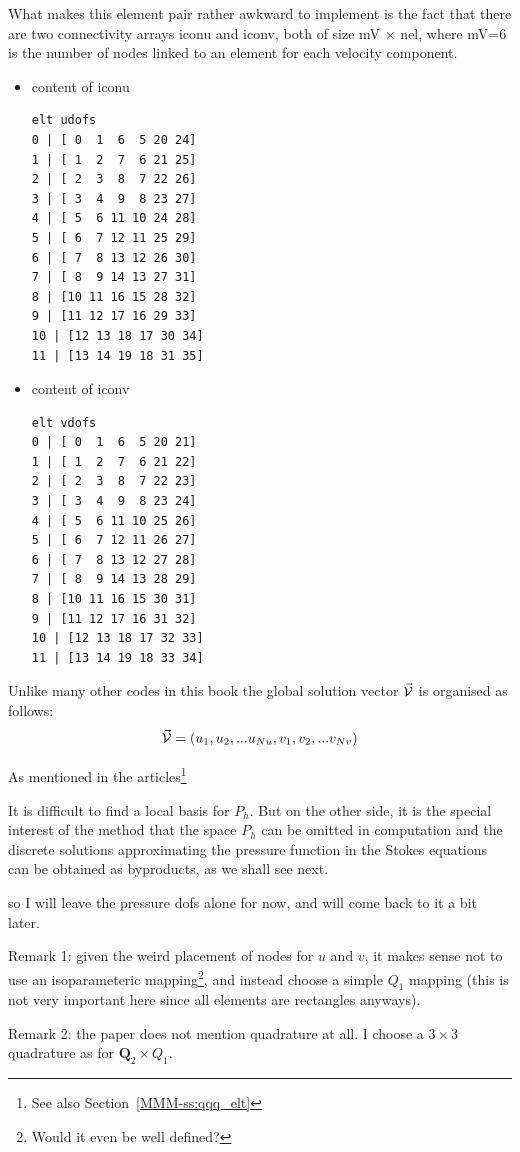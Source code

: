 What makes this element pair rather awkward to implement is the fact that 
there are two connectivity arrays {\python iconu} and {\python iconv}, both of size 
{\python mV} $\times$ {\python nel}, where 
{\python mV=6} is the number of nodes linked to an element for each velocity component. 
\begin{itemize}
\item content of {\python iconu}
\begin{verbatim}
elt udofs 
0 | [ 0  1  6  5 20 24]
1 | [ 1  2  7  6 21 25]
2 | [ 2  3  8  7 22 26]
3 | [ 3  4  9  8 23 27]
4 | [ 5  6 11 10 24 28]
5 | [ 6  7 12 11 25 29]
6 | [ 7  8 13 12 26 30]
7 | [ 8  9 14 13 27 31]
8 | [10 11 16 15 28 32]
9 | [11 12 17 16 29 33]
10 | [12 13 18 17 30 34]
11 | [13 14 19 18 31 35]
\end{verbatim}
\item content of {\python iconv}
\begin{verbatim}
elt vdofs 
0 | [ 0  1  6  5 20 21]
1 | [ 1  2  7  6 21 22]
2 | [ 2  3  8  7 22 23]
3 | [ 3  4  9  8 23 24]
4 | [ 5  6 11 10 25 26]
5 | [ 6  7 12 11 26 27]
6 | [ 7  8 13 12 27 28]
7 | [ 8  9 14 13 28 29]
8 | [10 11 16 15 30 31]
9 | [11 12 17 16 31 32]
10 | [12 13 18 17 32 33]
11 | [13 14 19 18 33 34]
\end{verbatim}
\end{itemize}

Unlike many other codes in this book the global solution vector $\vec{\cal V}$ 
is organised as follows:
\[
\vec{\cal V} = ( u_1, u_2, ... u_{Nu}, v_1, v_2, ... v_{Nv})
\]

As mentioned in the articles\footnote{See also Section~\ref{MMM-ss:qqq_elt}}  
\begin{displayquote}
{\color{darkgray}
It is difficult to ﬁnd a
local basis for $P_h$. But on the other side, it is the special interest of the method that
the space $P_h$ can be omitted in computation and the discrete solutions approximating
the pressure function in the Stokes equations can be obtained as byproducts, as we
shall see next.}
\end{displayquote}
so I will leave the pressure dofs alone for now, and will come back to it a bit later.

Remark 1: given the weird placement of nodes for $u$ and $v$, it makes sense not to 
use an isoparameteric 
mapping\footnote{Would it even be well defined?}, and instead choose a simple $Q_1$ mapping (this 
is not very important here since all elements are rectangles anyways).

Remark 2: the paper does not mention quadrature at all. 
I choose a $3\times 3$ quadrature as for ${\bm Q}_2\times Q_1$. 

